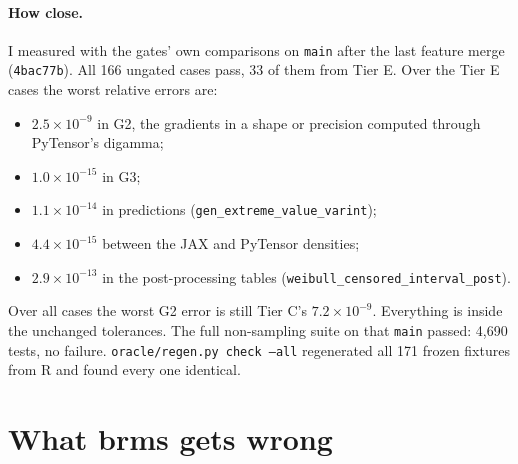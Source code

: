 \documentclass[11pt]{article}
\newcommand{\code}[1]{\texttt{#1}}
\begin{document}
\paragraph{How close.} I measured with the gates' own comparisons on \code{main} after the last feature merge
(\code{4bac77b}). All 166 ungated cases pass, 33 of them from Tier E. Over the Tier E cases the worst relative errors are:
\begin{itemize}
\item $2.5\times10^{-9}$ in G2, the gradients in a shape or precision computed through PyTensor's digamma;
\item $1.0\times10^{-15}$ in G3;
\item $1.1\times10^{-14}$ in predictions (\code{gen\_extreme\_value\_varint});
\item $4.4\times10^{-15}$ between the JAX and PyTensor densities;
\item $2.9\times10^{-13}$ in the post-processing tables (\code{weibull\_censored\_interval\_post}).
\end{itemize}
Over all cases the worst G2 error is still Tier C's $7.2\times10^{-9}$. Everything is inside the unchanged tolerances. The
full non-sampling suite on that \code{main} passed: 4{,}690 tests, no failure. \code{oracle/regen.py check --all}
regenerated all 171 frozen fixtures from R and found every one identical.

\section{What brms gets wrong}
\label{sec:brms}
\end{document}
